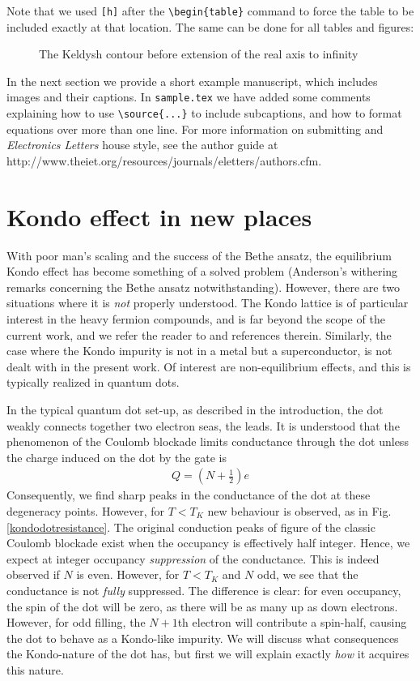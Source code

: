 \documentclass[11pt]{report}
\begin{document}
Note that we used \verb"[h]" after the \verb"\begin{table}" command to force the table to be included exactly at that location.  The same can be done for
all tables and figures:

\begin{figure}[h]
\caption{The Keldysh contour before extension of the real axis to infinity
\source{}}
\end{figure}

In the next section we provide a short example manuscript, which includes images and their captions.  In \verb"sample.tex" we have added some comments explaining how to use \verb"\source{...}" to include subcaptions, and how to format equations over more than one line.  For more information on submitting and \emph{Electronics Letters} house style, see the author guide at http://www.theiet.org/resources/journals/eletters/authors.cfm.

\section{Kondo effect in new places}
With poor man's scaling \cite{1} and the success of the Bethe ansatz, the equilibrium Kondo effect has become something of a solved problem (Anderson's withering remarks concerning the Bethe ansatz notwithstanding).  However, there are two situations where it is \emph{not} properly understood.  The Kondo lattice is of particular interest in the heavy fermion compounds, and is far beyond the scope of the current work, and we refer the reader to \cite{2} and references therein.  Similarly, the case where the Kondo impurity is not in a metal but a superconductor, is not dealt with in the present work.  Of interest are non-equilibrium effects, and this is typically realized in quantum dots.

In the typical quantum dot set-up, as described in the introduction, the dot weakly connects together two electron seas, the leads.  It is understood that the phenomenon of the Coulomb blockade limits conductance through the dot unless the charge induced on the dot by the gate is
\begin{align}
  Q=\left(N+\frac{1}{2}\right)e
\end{align}
Consequently, we find sharp peaks in the conductance of the dot at these degeneracy points.  However, for $T<T_{K}$ new behaviour is observed, as in Fig. \ref{kondodotresistance}.  The original conduction peaks of figure of the classic Coulomb blockade exist when the occupancy is effectively half integer.  Hence, we expect at integer occupancy \emph{suppression} of the conductance.  This is indeed observed if $N$ is even.  However, for $T<T_{K}$ and $N$ odd, we see that the conductance is not \emph{fully} suppressed.  The difference is clear: for even occupancy, the spin of the dot will be zero, as there will be as many up as down electrons.  However, for odd filling, the $N+1$th electron will contribute a spin-half, causing the dot to behave as a Kondo-like impurity.  We will discuss what consequences the Kondo-nature of the dot has, but first we will explain exactly \emph{how} it acquires this nature.
\end{document}
